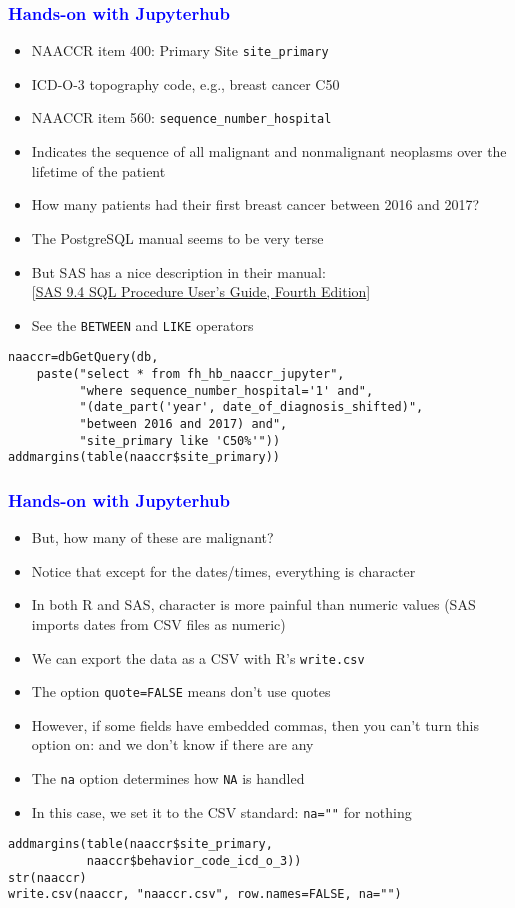 \documentclass[11pt,pdftex,dvipsnames,usenames]{beamer}
\begin{document}
\begin{frame}[fragile]\frametitle{\bf\textcolor{blue}{Hands-on with Jupyterhub}}
\begin{itemize}
\item NAACCR item 400: Primary Site \texttt{site\_primary}
\item ICD-O-3 topography code, e.g., breast cancer C50
\item NAACCR item 560: \texttt{sequence\_number\_hospital}
\item Indicates the sequence of all malignant and nonmalignant
neoplasms over the lifetime of the patient
\item How many patients had their first breast cancer between
2016 and 2017?
\item The PostgreSQL manual seems to be very terse
\item But SAS has a nice description in their manual: \\
\textcolor{PineGreen}{[\href{https://documentation.sas.com/doc/en/pgmsascdc/9.4_3.5/sqlproc/titlepage.htm}{SAS 9.4 SQL Procedure User’s Guide, Fourth Edition}]}
\item See the \texttt{BETWEEN} and \texttt{LIKE} operators
\end{itemize}
\begin{verbatim}
naaccr=dbGetQuery(db, 
    paste("select * from fh_hb_naaccr_jupyter",
          "where sequence_number_hospital='1' and",
          "(date_part('year', date_of_diagnosis_shifted)",
          "between 2016 and 2017) and",
          "site_primary like 'C50%'"))
addmargins(table(naaccr$site_primary))
\end{verbatim}
\end{frame}


\begin{frame}[fragile]\frametitle{\bf\textcolor{blue}{Hands-on with Jupyterhub}}
\begin{itemize}
\item But, how many of these are malignant?
\item Notice that except for the dates/times,
everything is character
\item In both R and SAS, character is more painful than numeric
values (SAS imports dates from CSV files as numeric)
\item We can export the data as a CSV with R's \texttt{write.csv}
\item The option \texttt{quote=FALSE} means don't use quotes
\item However, if some fields have embedded commas, then you
can't turn this option on: and we don't know if there are any
\item The \texttt{na} option determines how \texttt{NA} is handled
\item In this case, we set it to the CSV standard: \texttt{na=""}
for nothing 
\end{itemize}
\begin{verbatim}
addmargins(table(naaccr$site_primary, 
           naaccr$behavior_code_icd_o_3))
str(naaccr)
write.csv(naaccr, "naaccr.csv", row.names=FALSE, na="") 
\end{verbatim}
\end{frame}
\end{document}
